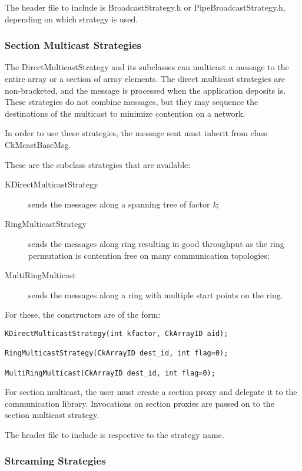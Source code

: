 {The header file to include is {\textrm{BroadcastStrategy.h}} or
{\textrm{PipeBroadcastStrategy.h}}, depending on which strategy is used.

\subsubsection{Section Multicast Strategies}

The DirectMulticastStrategy and its subclasses can multicast a message to the
entire array or a section of array elements. The direct multicast strategies are
non-bracketed, and the message is processed when the application deposits is.
These strategies do not combine messages, but they may sequence the destinations
of the multicast to minimize contention on a network.

In order to use these strategies, the message sent must inherit from class
{\textrm{CkMcastBaseMsg}}.

These are the subclass strategies that are available:

\begin{description}
\item[KDirectMulticastStrategy] sends the messages along a spanning tree of factor {\em k};
\item[RingMulticastStrategy] sends the messages along ring resulting in good throughput as the ring permutation is contention free on many communication topologies;
\item[MultiRingMulticast] sends the messages along a ring with multiple start points on the ring.
\end{description}

For these, the constructors are of the form:

\begin{verbatim}
KDirectMulticastStrategy(int kfactor, CkArrayID aid);

RingMulticastStrategy(CkArrayID dest_id, int flag=0);

MultiRingMulticast(CkArrayID dest_id, int flag=0);
\end{verbatim}

For section multicast, the user must create a section proxy and delegate it to
the communication library. Invocations on section proxies are passed on to the
section multicast strategy.

The header file to include is respective to the strategy name.

\subsubsection{Streaming Strategies}

}
